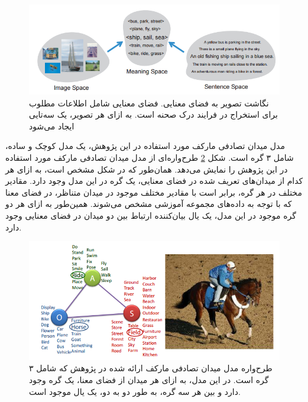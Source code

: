 \begin{figure}[h]
\center
\includegraphics[scale=0.7]{./Imgs/farhadi2010every_fig1.png}
\caption{
نگاشت تصویر به فضای معنایی. فضای معنایی شامل اطلاعات مطلوب برای استخراج در فرایند درک صحنه است. به ازای هر تصویر، یک سه‌تایی ایجاد می‌شود\cite{Farhadi2010every.}
}
\label{fig:F2010EF1}
\end{figure}

مدل میدان تصادفی مارکف مورد استفاده در این پژوهش، یک مدل کوچک و ساده، شامل ۳ گره است. شکل \ref{fig:F2010EF2}
طرح‌واره‌ای از مدل میدان تصادفی مارکف مورد استفاده در این پژوهش را نمایش می‌دهد. همان‌طور که در شکل مشخص است،  به ازای هر کدام از میدان‌های تعریف شده در فضای معنایی، یک گره در این مدل وجود دارد. مقادیر مختلف در هر گره، برابر است با مقادیر مختلف موجود در میدان متناظر، در فضای معنا که با توجه به داده‌های مجموعه‌‌ ‌آموزشی مشخص می‌شوند. همین‌طور به ازای هر دو گره موجود در این مدل، یک یال بیان‌کننده ارتباط بین دو میدان در فضای معنایی وجود دارد.

\begin{figure}[h]
\center
\includegraphics[scale=0.7]{./Imgs/farhadi2010every_fig2.png}
\caption{
طرح‌واره مدل میدان تصادفی مارکف ارائه شده در پژوهش \cite{Farhadi2010every} که شامل ۳ گره است. در این مدل، به ازای هر میدان از فضای معنا، یک گره وجود دارد و بین هر سه گره‌، به طور دو به دو، یک یال موجود است\cite{Farhadi2010every}.
}
\label{fig:F2010EF2}
\end{figure}

